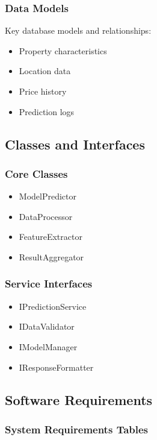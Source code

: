 \documentclass[12pt,a4paper]{report}
\begin{document}
\subsubsection{Data Models}
Key database models and relationships:
\begin{itemize}
    \item Property characteristics
    \item Location data
    \item Price history
    \item Prediction logs
\end{itemize}

\subsection{Classes and Interfaces}
\subsubsection{Core Classes}
\begin{itemize}
    \item ModelPredictor
    \item DataProcessor
    \item FeatureExtractor
    \item ResultAggregator
\end{itemize}

\subsubsection{Service Interfaces}
\begin{itemize}
    \item IPredictionService
    \item IDataValidator
    \item IModelManager
    \item IResponseFormatter
\end{itemize}

\subsection{Software Requirements}
\subsubsection{System Requirements Tables}
\end{document}
